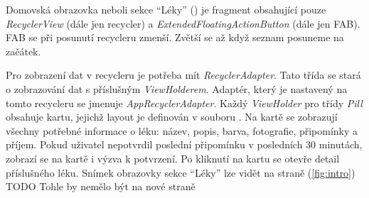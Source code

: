 \documentclass[../TakeYourPill.tex]{subfiles}
\begin{document}
Domovská obrazovka neboli sekce \enquote{Léky} () je fragment obsahující pouze \textit{RecyclerView} (dále jen recycler) a \textit{ExtendedFloatingActionButton} (dále jen FAB). FAB se při posunutí recycleru zmenší. Zvětší se až když seznam posuneme na začátek. 

Pro zobrazení dat v recycleru je potřeba mít \textit{RecyclerAdapter}. Tato třída se stará o zobrazování dat s příslušným \textit{ViewHolderem}. Adaptér, který je nastavený na tomto recycleru se jmenuje \textit{AppRecyclerAdapter}. Každý \emph{ViewHolder} pro třídy \emph{Pill} obsahuje kartu, jejichž layout je definován v souboru . Na kartě se zobrazují všechny potřebné informace o léku: název, popis, barva, fotografie, připomínky a příjem. Pokud uživatel nepotvrdil poslední připomínku v posledních 30 minutách, zobrazí se na kartě i výzva k potvrzení. Po kliknutí na kartu se otevře detail příslušného léku. Snímek obrazovky sekce \enquote{Léky} lze vidět na straně \pageref{fig:intro} (\ref{fig:intro})
TODO Tohle by nemělo být na nové straně



\end{document}
